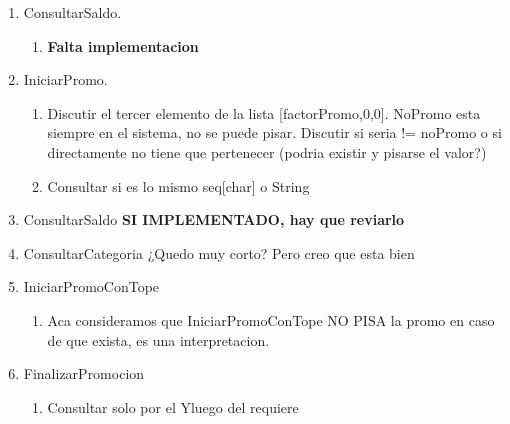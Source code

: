 \documentclass[11pt,a4paper]{article}
\begin{document}
\begin{enumerate}
\begin{enumerate}
		      \item Respuesta a ¿Debo poner dos transacciones en el historial? NO.
		      \item TieneSuficientesMillas se podria utilizar la funcion auxiliar MillasDisponibles implementada en el punto 4.
		      \item Que quiere decir en el enunciado "No se aplica comisión"? Esta muy confusa la ultima parte, como es que se "conservan las millas disponibles"?
		      \item \textbf{Para mi la resolucion hace lo correcto, pero el enunciado no tiene mucho sentido, hay que consultarlo}
		      \item \textbf{Faltaria una condicion en el asegura que es fijarse si el usuario subio de categoria al recibir transferencia. Revisar el anteultimo asegura de AcumularMillas} 
	      \end{enumerate}
	\item ConsultarSaldo.
	      \begin{enumerate}
		      \item \textbf{Falta implementacion} 
	      \end{enumerate}
	\item IniciarPromo.
	      \begin{enumerate}
		      \item Discutir el tercer elemento de la lista [factorPromo,0,0]. NoPromo esta siempre en el sistema, no se puede pisar. Discutir si seria != noPromo o si directamente no tiene que
		            pertenecer (podria existir y pisarse el valor?)
		      \item Consultar si es lo mismo seq[char] o String
	      \end{enumerate}
	\item ConsultarSaldo \textbf{SI IMPLEMENTADO, hay que reviarlo}
	\item ConsultarCategoria
	      ¿Quedo muy corto? Pero creo que esta bien
	\item IniciarPromoConTope
	      \begin{enumerate}
		      \item Aca consideramos que IniciarPromoConTope NO PISA la promo en caso de que exista, es una interpretacion.
	      \end{enumerate}
	\item FinalizarPromocion
	      \begin{enumerate}
		      \item Consultar solo por el Yluego del requiere

\end{enumerate}
\end{enumerate}
\end{document}
